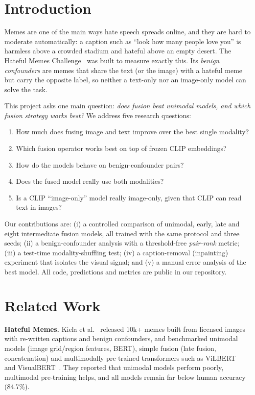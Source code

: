 \documentclass[conference]{IEEEtran}
\begin{document}
\section{Introduction}
Memes are one of the main ways hate speech spreads online, and they are hard to moderate automatically: a caption
such as ``look how many people love you'' is harmless above a crowded stadium and hateful above an empty desert. The
Hateful Memes Challenge~\cite{kiela2020} was built to measure exactly this. Its \emph{benign confounders} are memes
that share the text (or the image) with a hateful meme but carry the opposite label, so neither a text-only nor an
image-only model can solve the task.

This project asks one main question: \emph{does fusion beat unimodal models, and which fusion strategy works best?}
We address five research questions:
\begin{enumerate}
  \item How much does fusing image and text improve over the best single modality?
  \item Which fusion operator works best on top of frozen CLIP embeddings?
  \item How do the models behave on benign-confounder pairs?
  \item Does the fused model really use both modalities?
  \item Is a CLIP ``image-only'' model really image-only, given that CLIP can read text in images?
\end{enumerate}

Our contributions are: (i) a controlled comparison of unimodal, early, late and eight intermediate fusion models,
all trained with the same protocol and three seeds; (ii) a benign-confounder analysis with a threshold-free
\emph{pair-rank} metric; (iii) a test-time modality-shuffling test; (iv) a caption-removal (inpainting) experiment
that isolates the visual signal; and (v) a manual error analysis of the best model. All code, predictions and
metrics are public in our repository.

\section{Related Work}
\textbf{Hateful Memes.} Kiela et al.~\cite{kiela2020} released 10k+ memes built from licensed images with
re-written captions and benign confounders, and benchmarked unimodal models (image grid/region features, BERT),
simple fusion (late fusion, concatenation) and multimodally pre-trained transformers such as
ViLBERT~\cite{lu2019vilbert} and VisualBERT~\cite{li2019visualbert}. They reported that unimodal models perform
poorly, multimodal pre-training helps, and all models remain far below human accuracy (84.7\%).
\end{document}
